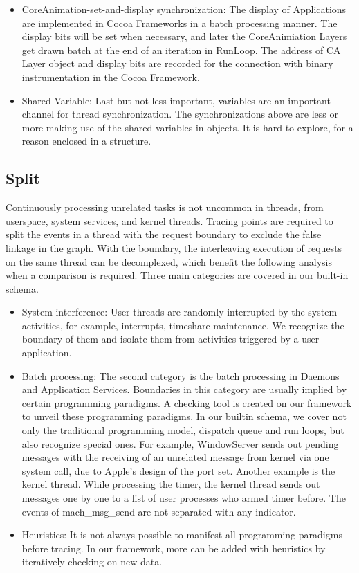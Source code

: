\begin{itemize}
        \item CoreAnimation-set-and-display synchronization: The display of Applications are implemented in Cocoa Frameworks in a batch processing manner. The display bits will be set when necessary, and later the CoreAnimiation Layers get drawn batch at the end of an iteration in RunLoop. The address of CA Layer object and display bits are recorded for the connection with binary instrumentation in the Cocoa Framework.
        \item Shared Variable: Last but not less important, variables are an important channel for thread synchronization. The synchronizations above are less or more making use of the shared variables in objects. It is hard to explore, for a reason enclosed in a structure.
\end{itemize}

\subsection{Split}                                                                                                       
Continuously processing unrelated tasks is not uncommon in threads, from userspace, system services, and kernel threads.
Tracing points are required to split the events in a thread with the request boundary to exclude the false linkage in the graph.
With the boundary, the interleaving execution of requests on the same thread can be decomplexed, which benefit the following analysis when a comparison is required.
Three main categories are covered in our built-in schema.
\begin{itemize}
	\item System interference: User threads are randomly interrupted by the system activities, for example, interrupts, timeshare maintenance. We recognize the boundary of them and isolate them from activities triggered by a user application.
	\item Batch processing: The second category is the batch processing in Daemons and Application Services. Boundaries in this category are usually implied by certain programming paradigms. A checking tool is created on our framework to unveil these programming paradigms. In our builtin schema, we cover not only the traditional programming model, dispatch queue and run loops, but also recognize special ones. For example, WindowServer sends out pending messages with the receiving of an unrelated message from kernel via one system call, due to Apple's design of the port set. Another example is the kernel thread. While processing the timer, the kernel thread sends out messages one by one to a list of user processes who armed timer before. The events of mach\_msg\_send are not separated with any indicator.
	\item Heuristics: It is not always possible to manifest all programming paradigms before tracing. In our framework, more can be added with heuristics by iteratively checking on new data.
\end{itemize}


